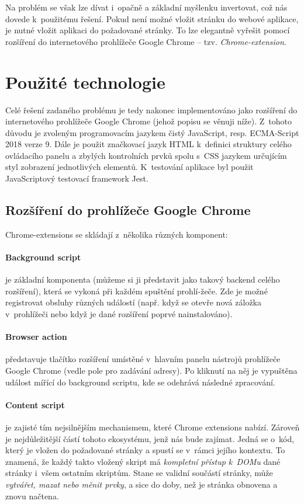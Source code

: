 \documentclass[thesis=B,czech]{FITthesis}[2012/06/26]
\begin{document}
Na problém se však lze dívat i~opačně a základní myšlenku invertovat, což nás dovede k~použitému řešení. Pokud není možné vložit stránku do webové aplikace, je nutné vložit aplikaci do požadované stránky. To lze elegantně vyřešit pomocí rozšíření do internetového prohlížeče Google Chrome -- tzv. \emph{Chrome-extension}.

\section{Použité technologie}	
Celé řešení zadaného problému je tedy nakonec implementováno jako rozšíření do internetového prohlížeče Google Chrome (jehož popisu se věnuji níže). Z~tohoto důvodu je zvoleným programovacím jazykem čistý JavaScript, resp. ECMA-Script 2018 verze 9. Dále je použit značkovací jazyk HTML k~definici struktury celého ovládacího panelu a zbylých kontrolních prvků spolu s~CSS jazykem určujícím styl zobrazení jednotlivých elementů. K~testování aplikace byl použit JavaScriptový testovací framework Jest.

\subsection{Rozšíření do prohlížeče Google Chrome}
Chrome-extensions se skládají z~několika různých komponent:
\paragraph{Background script} je základní komponenta (můžeme si ji představit jako takový backend celého rozšíření), která se vykoná při každém spuštění prohlí-žeče. Zde je možné registrovat obsluhy různých událostí (např. když se otevře nová záložka v~prohlížeči nebo když je dané rozšíření poprvé nainstalováno). 
\paragraph{Browser action} představuje tlačítko rozšíření umístěné v~hlavním panelu nástrojů prohlížeče Google Chrome (vedle pole pro zadávání adresy). Po kliknutí na něj je vypuštěna událost mířící do background scriptu, kde se odehrává následné zpracování.
\paragraph{Content script}\label{def:content_script} je zajisté tím nejsilnějším mechanismem, které Chrome extensions nabízí. Zároveň je nejdůležitější částí tohoto ekosystému, jenž nás bude zajímat. Jedná se o~kód, který je vložen do požadované stránky a spustí se v~rámci jejího kontextu. To znamená, že každý takto vložený skript má \emph{kompletní přístup k~DOMu} dané stránky i~všem ostatním skriptům. Stane se validní součástí stránky, může \emph{vytvářet, mazat nebo měnit prvky}, a sice do doby, než je stránka obnovena a znovu načtena.
\end{document}
